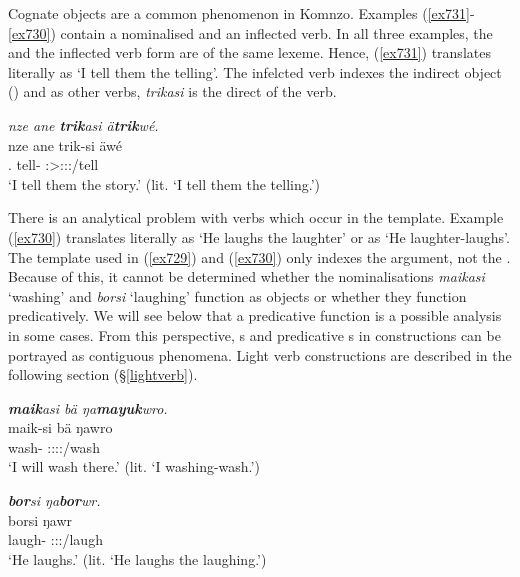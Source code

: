 Cognate objects are a common phenomenon in Komnzo. Examples (\ref{ex731}-\ref{ex730}) contain a nominalised  and an inflected verb. In all three examples, the  and the inflected verb form are of the same lexeme. Hence, (\ref{ex731}) translates literally as `I tell them the telling'. The infelcted verb indexes the indirect object (\Stpl) and as other  verbs, \emph{trikasi} is the direct  of the verb.

\begin{exe}
	\ex \emph{nze ane \textbf{trik}asi ä\textbf{trik}wé.}\\
	\gll nze ane trik-si äwé\\
	\Fsg.{\Erg} {\Dem} tell-{\Nmlz} \Fsg:\Sbj>\Stpl:\Io:\Nonpast:\Ipfv/tell\\
	\trans `I tell them the story.' (lit. `I tell them the telling.')
	\label{ex731}
\end{exe}

There is an analytical problem with verbs which occur in the  template. Example (\ref{ex730}) translates literally as `He laughs the laughter' or as `He laughter-laughs'. The  template used in (\ref{ex729}) and (\ref{ex730}) only indexes the  argument, not the . Because of this, it cannot be determined whether the nominalisations \emph{maikasi} `washing' and \emph{borsi} `laughing' function as objects or whether they function predicatively. We will see below that a predicative function is a possible analysis in some cases. From this perspective, s and predicative s in  constructions can be portrayed as contiguous phenomena. Light verb constructions are described in the following section ({\S}\ref{lightverb}).

\begin{exe}
	\ex \emph{\textbf{maik}asi bä ŋa\textbf{mayuk}wro.}\\
	\gll maik-si bä ŋawro\\
	wash-{\Nmlz} \Med{} \Sg:\Sbj:\Nonpast:\Ipfv:\Andat/wash\\
	\trans `I will wash there.' (lit. `I washing-wash.')
	\label{ex729}
\end{exe}
\begin{exe}
	\ex \emph{\textbf{bor}si ŋa\textbf{bor}wr.}\\
	\gll borsi ŋawr\\
	laugh-{\Nmlz} \Stsg:\Sbj:\Nonpast:\Ipfv/laugh\\
	\trans `He laughs.' (lit. `He laughs the laughing.')
	\label{ex730}
\end{exe}

